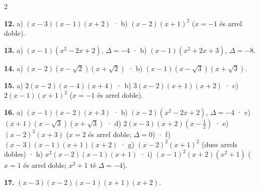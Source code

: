 \documentclass[13pt,a4paper]{extarticle}
\begin{document}
\begin{multicols}{2}
\begin{minipage}{\linewidth}
\textbf{12.} a) $(x-3)(x-1)(x+2)$ · b) $(x-2)(x+1)^2$ ($x=-1$ és arrel doble).\par
\end{minipage}\par\vspace{1.6mm}
\par\noindent\begin{minipage}{\linewidth}
\textbf{13.} a) $(x-1)(x^2-2x+2)$, $\Delta=-4$ · b) $(x-1)(x^2+2x+3)$, $\Delta=-8$.\par
\end{minipage}\par\vspace{1.6mm}
\par\noindent\begin{minipage}{\linewidth}
\textbf{14.} a) $(x-2)(x-\sqrt2)(x+\sqrt2)$ · b) $(x-1)(x-\sqrt3)(x+\sqrt3)$.\par
\end{minipage}\par\vspace{1.6mm}
\par\noindent\begin{minipage}{\linewidth}
\textbf{15.} a) $2(x-2)(x-4)(x+4)$ · b) $3(x-2)(x+1)(x+2)$ · c) $2(x-1)(x+1)^2$ ($x=-1$ és arrel doble).\par
\end{minipage}\par\vspace{1.6mm}
\par\noindent\begin{minipage}{\linewidth}
\textbf{16.} a) $(x-1)(x-2)(x+3)$ · b) $(x-2)(x^2-2x+2)$, $\Delta=-4$ · c) $(x+1)(x-\sqrt3)(x+\sqrt3)$ · d) $2(x-3)(x+2)\left(x-\tfrac12\right)$ · e) $(x-2)^2(x+3)$ ($x=2$ és arrel doble; $\Delta=0$) · f) $(x-3)(x-1)(x+1)(x+2)$ · g) $(x-2)^2(x+1)^2$ (dues arrels dobles) · h) $x^2(x-2)(x-1)(x+1)$ · i) $(x-1)^2(x+2)(x^2+1)$ ($x=1$ és arrel doble; $x^2+1$ té $\Delta=-4$).\par
\end{minipage}\par\vspace{1.6mm}
\par\noindent\begin{minipage}{\linewidth}
\textbf{17.} $(x-3)(x-2)(x-1)(x+1)(x+2)$.\par
\end{minipage}\par\vspace{1.6mm}
\par\noindent\begin{minipage}{\linewidth}

\end{minipage}
\end{multicols}
\end{document}
